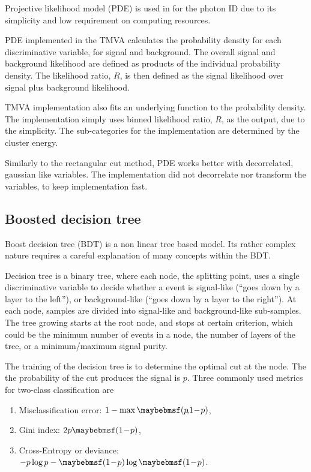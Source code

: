 Projective likelihood model (PDE) is used in \pandora for the photon ID due to its simplicity and low requirement on computing resources.

PDE implemented in the TMVA calculates the probability density for each discriminative variable, for signal and background. The overall signal and background likelihood are defined as products of the individual probability density. The likelihood ratio, $R$, is then defined as the signal likelihood over signal plus background likelihood.

TMVA implementation also fits an underlying function to the probability density. The \pandora implementation simply uses binned likelihood ratio, $R$, as the output, due to the simplicity. The sub-categories for the \pandora implementation are determined by the cluster energy.

Similarly to the rectangular cut method, PDE works better with decorrelated, gaussian like variables. The \pandora implementation did not decorrelate nor transform the variables, to keep implementation fast.


\subsection{Boosted decision tree}

Boost decision tree (BDT) is a non linear tree based model. Its rather complex nature requires a careful explanation of many concepts within the BDT.  

Decision tree is a binary tree, where each node, the splitting point, uses a single discriminative variable to decide whether a event is signal-like (``goes down by a layer to the left''), or background-like (``goes down by a layer to the right''). At each node, samples are divided into signal-like and background-like sub-samples. The tree growing starts at the root node, and stops at certain criterion, which could be the minimum number of events in a node, the number of layers of the tree, or a minimum/maximum signal purity. 

The training of the decision tree is to determine the optimal cut at the node. The the probability of the cut produces the signal is $p$. Three commonly used metrics for two-class classification are
\begin{enumerate}
\item Misclassification error:  $1 - \max\parenths{p\!,\!1\!-\!p}$,
\item Gini index: $2p\parenths{1\!-\!p}$,
\item Cross-Entropy or deviance: $-p\log{p}-\parenths{1\!-\!p}\log\parenths{1\!-\!p}$.
\end{enumerate}

